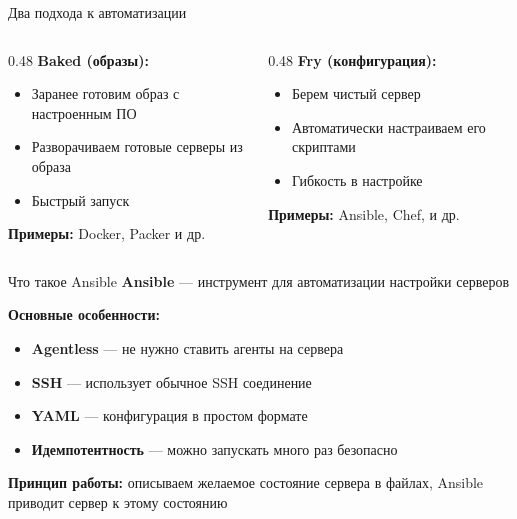 \documentclass[aspectratio=169]{beamer}
\begin{document}
    \begin{frame}{Два подхода к автоматизации}
        \begin{columns}[t]
            \begin{column}[t]{0.48\textwidth}
                \textbf{Baked (образы):}
                \begin{itemize}
                    \item Заранее готовим образ с настроенным ПО
                    \item Разворачиваем готовые серверы из образа
                    \item Быстрый запуск
                \end{itemize}
                
                \vspace{0.3cm}
                \textbf{Примеры:} Docker, Packer и др.
            \end{column}
            
            \begin{column}[t]{0.48\textwidth}
                \textbf{Fry (конфигурация):}
                \begin{itemize}
                    \item Берем чистый сервер
                    \item Автоматически настраиваем его скриптами
                    \item Гибкость в настройке
                \end{itemize}
                
                \vspace{0.3cm}
                \textbf{Примеры:} Ansible, Chef, и др.
            \end{column}
        \end{columns}
        
    \end{frame}

    \begin{frame}{Что такое Ansible}
        \textbf{Ansible} — инструмент для автоматизации настройки серверов
        
        \vspace{0.3cm}
        
        \textbf{Основные особенности:}
        \begin{itemize}
            \item \textbf{Agentless} — не нужно ставить агенты на сервера
            \item \textbf{SSH} — использует обычное SSH соединение
            \item \textbf{YAML} — конфигурация в простом формате
            \item \textbf{Идемпотентность} — можно запускать много раз безопасно
        \end{itemize}
        
        \vspace{0.5cm}
        
        \textbf{Принцип работы:} описываем желаемое состояние сервера в файлах, Ansible приводит сервер к этому состоянию
    \end{frame}
\end{document}
